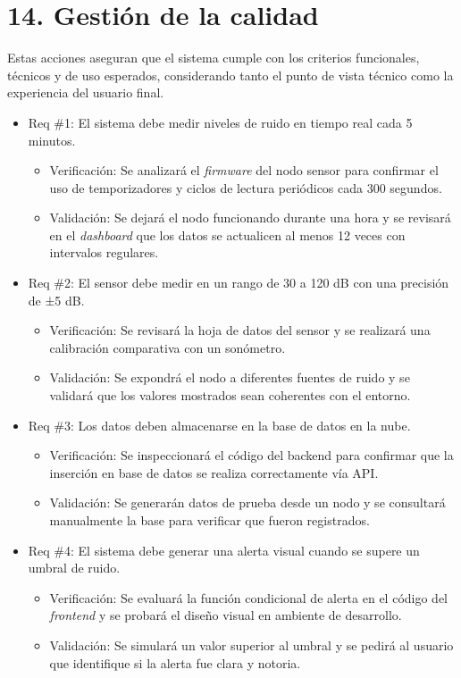 \documentclass[
11pt, %
]{charter}
\begin{document}
\section{14. Gestión de la calidad}
\label{sec:calidad}

Estas acciones aseguran que el sistema cumple con los criterios funcionales, técnicos y de uso esperados, considerando tanto 
el punto de vista técnico como la experiencia del usuario final.

\begin{itemize}

\item Req \#1: El sistema debe medir niveles de ruido en tiempo real cada 5 minutos.
\begin{itemize}
	\item Verificación: Se analizará el \textit{firmware} del nodo sensor para confirmar el uso de temporizadores y ciclos de lectura 
    periódicos cada 300 segundos.
	\item Validación: Se dejará el nodo funcionando durante una hora y se revisará en el \textit{dashboard} que los datos se actualicen 
    al menos 12 veces con intervalos regulares.
\end{itemize}

\item Req \#2: El sensor debe medir en un rango de 30 a 120 dB con una precisión de ±5 dB.
\begin{itemize}
	\item Verificación: Se revisará la hoja de datos del sensor y se realizará una calibración comparativa con un sonómetro.
	\item Validación: Se expondrá el nodo a diferentes fuentes de ruido y se validará que los valores mostrados sean coherentes 
    con el entorno.
\end{itemize}

\item Req \#3: Los datos deben almacenarse en la base de datos en la nube.
\begin{itemize}
	\item Verificación: Se inspeccionará el código del backend para confirmar que la inserción en base de datos se realiza 
    correctamente vía API.
	\item Validación: Se generarán datos de prueba desde un nodo y se consultará manualmente la base para verificar que 
    fueron registrados.
\end{itemize}

\item Req \#4: El sistema debe generar una alerta visual cuando se supere un umbral de ruido.
\begin{itemize}
	\item Verificación: Se evaluará la función condicional de alerta en el código del \textit{frontend} y se probará el diseño visual en 
    ambiente de desarrollo.
	\item Validación: Se simulará un valor superior al umbral y se pedirá al usuario que identifique si la alerta fue clara y 
    notoria.
\end{itemize}


\end{itemize}
\end{document}
